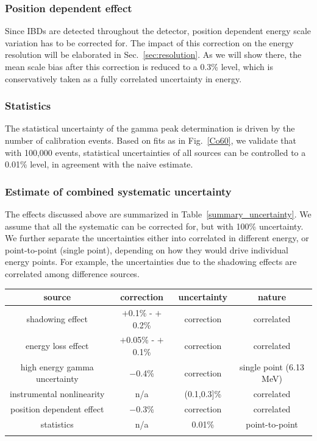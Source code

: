 \documentclass[a4paper,10pt,twoside]{cpc-hepnp}
\begin{document}
\begin{CJK*}{GB}{gbsn}
\begin{multicols}{2}
\subsubsection{Position dependent effect}
\label{sec:position_dep_bias}
Since IBDs are detected throughout the detector, position dependent
energy scale variation has to be corrected for. 
The impact of this correction on the energy resolution will be elaborated in Sec.~{\ref{sec:resolution}}.
As we will show there, the mean scale
bias after this correction is reduced to a 0.3\% level, which is
conservatively taken as a fully correlated uncertainty in energy.

\subsubsection{Statistics}
The statistical uncertainty of the gamma peak determination is driven
by the number of calibration events. Based on fits as in
Fig.~\ref{Co60}, we validate that with 100,000 events, statistical
uncertainties of all sources can be controlled to a 0.01\% level, in
agreement with the naive estimate.

\subsubsection{Estimate of combined systematic uncertainty}
The effects discussed above are summarized in
Table~\ref{summary_uncertainty}. We assume that all the systematic can
be corrected for, but with 100\% uncertainty. We further separate the
uncertainties either into correlated in different energy, or point-to-point (single
point), depending on how they would drive individual energy
points. For example, the uncertainties due to the shadowing effects
are correlated among difference sources.

\end{multicols}

\begin{center}
	\footnotesize
	\begin{tabular*}{170mm}{@{\extracolsep{\fill}}cccc}
          \toprule source & correction & uncertainty & nature\\
          \hline
          shadowing effect & $+$0.1\% - $+$0.2\% & correction & correlated \\
          energy loss effect & $+$0.05\% - $+$0.1\% & correction  & correlated \\
          high energy gamma uncertainty & $-$0.4\% & correction & single point (6.13 MeV) \\
          instrumental nonlinearity & n/a & (0.1,0.3]\% & correlated\\
          position dependent effect & $-$0.3\% & correction & correlated\\
          statistics & n/a & 0.01\% & point-to-point\\ 
          \bottomrule  %
          \label{summary_uncertainty}
	\end{tabular*}
      \end{center}


\end{CJK*}
\end{document}
